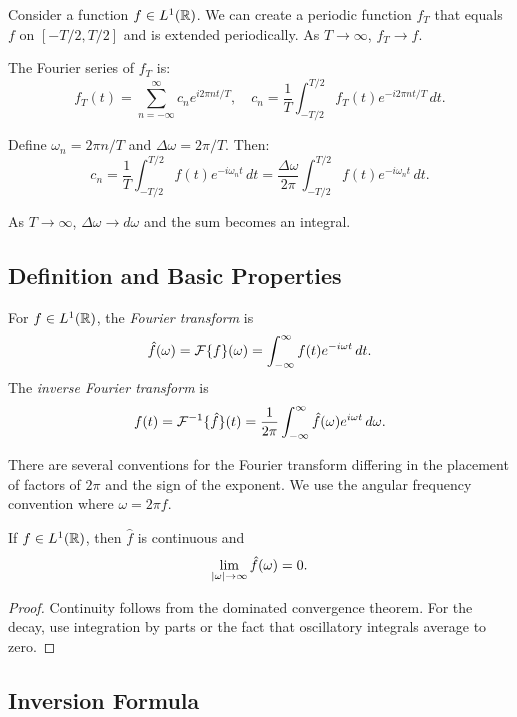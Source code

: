 \begin{notechapter}
Consider a function $f \in L^1(\mathbb{R})$. We can create a periodic function $f_T$ that equals $f$ on $[-T/2, T/2]$ and is extended periodically. As $T \to \infty$, $f_T \to f$.

The Fourier series of $f_T$ is:
\[
f_T(t) = \sum_{n=-\infty}^{\infty} c_n e^{i 2\pi n t/T}, \quad c_n = \frac{1}{T} \int_{-T/2}^{T/2} f_T(t) e^{-i 2\pi n t/T} \, dt.
\]

Define $\omega_n = 2\pi n/T$ and $\Delta \omega = 2\pi/T$. Then:
\[
c_n = \frac{1}{T} \int_{-T/2}^{T/2} f(t) e^{-i\omega_n t} \, dt = \frac{\Delta \omega}{2\pi} \int_{-T/2}^{T/2} f(t) e^{-i\omega_n t} \, dt.
\]

As $T \to \infty$, $\Delta \omega \to d\omega$ and the sum becomes an integral.

\subsection{Definition and Basic Properties}

\begin{definition}
For $f \in L^1(\mathbb{R})$, the \emph{Fourier transform} is
\[
\hat{f}(\omega) = \mathcal{F}\{f\}(\omega) = \int_{-\infty}^{\infty} f(t) e^{-i\omega t} \, dt.
\]
The \emph{inverse Fourier transform} is
\[
f(t) = \mathcal{F}^{-1}\{\hat{f}\}(t) = \frac{1}{2\pi} \int_{-\infty}^{\infty} \hat{f}(\omega) e^{i\omega t} \, d\omega.
\]
\end{definition}

\begin{remark}
There are several conventions for the Fourier transform differing in the placement of factors of $2\pi$ and the sign of the exponent. We use the angular frequency convention where $\omega = 2\pi f$.
\end{remark}

\begin{theorem}
If $f \in L^1(\mathbb{R})$, then $\hat{f}$ is continuous and
\[
\lim_{\left|\omega\right| \to \infty} \hat{f}(\omega) = 0.
\]
\end{theorem}

\begin{proof}
Continuity follows from the dominated convergence theorem. For the decay, use integration by parts or the fact that oscillatory integrals average to zero.
\end{proof}

\subsection{Inversion Formula}


\end{notechapter}
